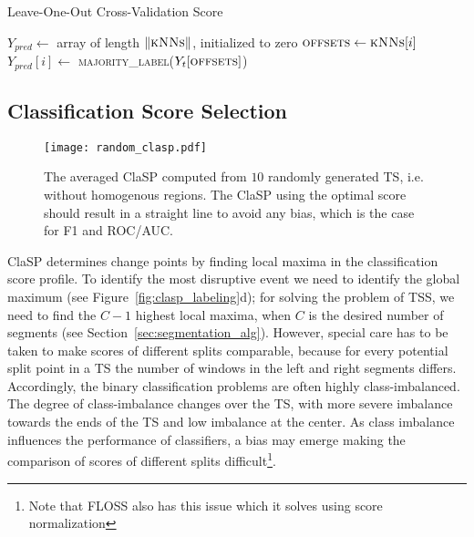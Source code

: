 \documentclass[pdflatex,sn-basic]{sn-jnl}
\begin{document}
\begin{algorithm}[t]
	\caption{Leave-One-Out Cross-Validation Score}\label{alg:knn_score}
	\begin{algorithmic}[1]
		
			\State $Y_{pred} \gets $ array of length $\|\textsc{kNNs}\|$, initialized to zero 
			 
		        \State $\textsc{offsets} \gets \textsc{kNNs}[i]$ 
				\State $Y_{pred}[i] \gets $ \textsc{majority\_label}($Y_{t}[\textsc{offsets}]$)
			\EndFor 
			\State {}
		\EndProcedure
	\end{algorithmic}
\end{algorithm}


\subsection{Classification Score Selection} \label{sec:scoring}

\begin{figure}[t]
	\texttt{[image: random\_clasp.pdf]}
	\caption{The averaged ClaSP computed from $10$ randomly generated TS, i.e. without homogenous regions. The ClaSP using the optimal score should result in a straight line to avoid any bias, which is the case for F1 and ROC/AUC.\label{fig:ClaSP_random}
	}
\end{figure}

ClaSP determines change points by finding local maxima in the classification score profile. To identify the most disruptive event we need to identify the global maximum (see Figure~\ref{fig:clasp_labeling}d); for solving the problem of TSS, we need to find the $C-1$ highest local maxima, when $C$ is the desired number of segments (see Section~\ref{sec:segmentation_alg}). However, special care has to be taken to make scores of different splits comparable, because for every potential split point in a TS the number of windows in the left and right segments differs. Accordingly, the binary classification problems are often highly class-imbalanced. The degree of class-imbalance changes over the TS, with more severe imbalance towards the ends of the TS and low imbalance at the center. As class imbalance influences the performance of classifiers, a bias may emerge making the comparison of scores of different splits difficult\footnote{Note that FLOSS also has this issue which it solves using score normalization}. 
\end{document}
